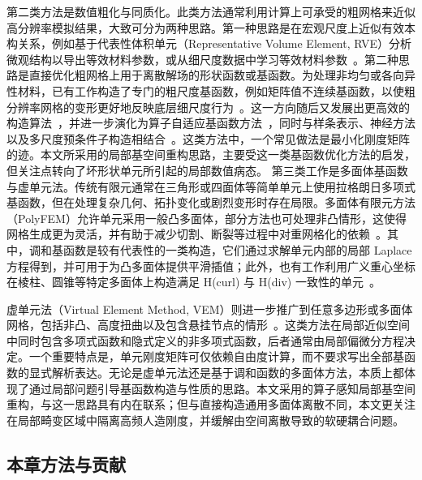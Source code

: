 第二类方法是数值粗化与同质化。此类方法通常利用计算上可承受的粗网格来近似高分辨率模拟结果，大致可分为两种思路。第一种思路是在宏观尺度上近似有效本构关系，例如基于代表性体积单元（Representative Volume Element, RVE）分析微观结构以导出等效材料参数，或从细尺度数据中学习等效材料参数~\cite{Geers2010, Lukas2020, Bacigalupo2014, OstojaStarzewski2006, ChenDdFEM2015, li2023NeuralMetamaterialNetworks}。第二种思路是直接优化粗网格上用于离散解场的形状函数或基函数。为处理非均匀或各向异性材料，已有工作构造了专门的粗尺度基函数，例如矩阵值不连续基函数，以使粗分辨率网格的变形更好地反映底层细尺度行为~\cite{chen2018numerical}。这一方向随后又发展出更高效的构造算法~\cite{heFast2023}，并进一步演化为算子自适应基函数方法~\cite{chen2019material}，同时与样条表示、神经方法以及多尺度预条件子构造相结合~\cite{Li2022CBN, ni_numerical_2023, chen_multiscale_2021}。这类方法中，一个常见做法是最小化刚度矩阵的迹。本文所采用的局部基空间重构思路，主要受这一类基函数优化方法的启发，但关注点转向了坏形状单元所引起的局部数值病态。
第三类工作是多面体基函数与虚单元法。传统有限元通常在三角形或四面体等简单单元上使用拉格朗日多项式基函数，但在处理复杂几何、拓扑变化或剧烈变形时存在局限。多面体有限元方法（PolyFEM）允许单元采用一般凸多面体，部分方法也可处理非凸情形，这使得网格生成更为灵活，并有助于减少切割、断裂等过程中对重网格化的依赖~\cite{SukumarMalsch2006, Jabbari2022AdaptiveRefinement}。其中，调和基函数是较有代表性的一类构造，它们通过求解单元内部的局部 Laplace 方程得到，并可用于为凸多面体提供平滑插值；此外，也有工作利用广义重心坐标在棱柱、圆锥等特定多面体上构造满足 H(curl) 与 H(div) 一致性的单元~\cite{Dasgupta2003, Chen2020PrismsCones}。

虚单元法（Virtual Element Method, VEM）则进一步推广到任意多边形或多面体网格，包括非凸、高度扭曲以及包含悬挂节点的情形~\cite{BeiraoDaVeiga2013a_VEMBasic, BeiraoDaVeiga2013b_VEMHitchhiker, GainesJenkins2015}。这类方法在局部近似空间中同时包含多项式函数和隐式定义的非多项式函数，后者通常由局部偏微分方程决定。一个重要特点是，单元刚度矩阵可仅依赖自由度计算，而不要求写出全部基函数的显式解析表达。无论是虚单元法还是基于调和函数的多面体方法，本质上都体现了通过局部问题引导基函数构造与性质的思路。本文采用的算子感知局部基空间重构，与这一思路具有内在联系；但与直接构造通用多面体离散不同，本文更关注在局部畸变区域中隔离高频人造刚度，并缓解由空间离散导致的软硬耦合问题。



\subsection{本章方法与贡献}

